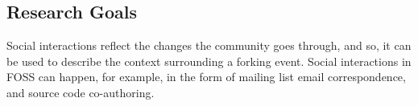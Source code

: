 \documentclass[12pt,letterpaper]{gthesis2}  %
\begin{document}

\subsection*{Research Goals}
\label{ResearchGoals}
\label{ResearchObjective}

Social interactions reflect the changes the community goes through, and so, it can be used to describe the context surrounding a forking event. Social interactions in FOSS can happen, for example, in the form of mailing list email correspondence, and source code co-authoring. 

%
%
\end{document}

